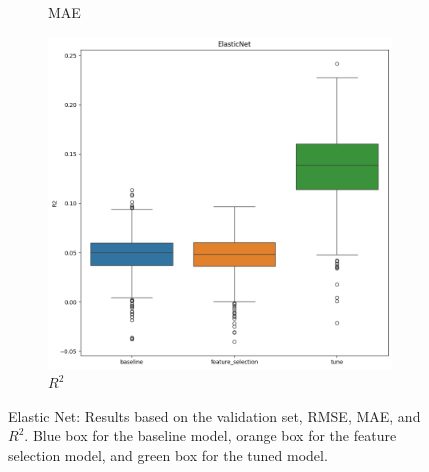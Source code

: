 \documentclass[12pt]{article}
\begin{document}
\begin{figure}[H]
\begin{subfigure}{0.3\textwidth}
        \caption{MAE}
        \label{fig:elasticnet_mae}
    \end{subfigure}
    \begin{subfigure}{0.3\textwidth}
        \centering
        \includegraphics[width=\linewidth]{ims/elasticnet_r2.png}
        \caption{$R^2$}
        \label{fig:elasticnet_r2}
    \end{subfigure}
    \caption{Elastic Net: Results based on the validation set, RMSE, MAE, and $R^2$.
    Blue box for the baseline model, orange box for the feature selection model, and
    green box for the tuned model.}
    \label{fig:elasticnet_results}
\end{figure}
\end{document}
